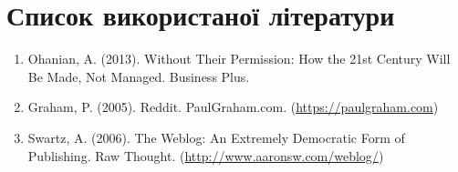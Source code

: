 \documentclass[oneside,14pt]{extarticle}
\begin{document}
\newpage
\section*{Список використаної літератури}
\begin{enumerate}
	\item Ohanian, A. (2013). Without Their Permission: How the 21st Century Will Be Made, Not Managed. Business Plus.
\item Graham, P. (2005). Reddit. PaulGraham.com. (\href{https://PaulGraham.com}{https://paulgraham.com})
\item Swartz, A. (2006). The Weblog: An Extremely Democratic Form of Publishing. Raw Thought. (\href{http://www.aaronsw.com/weblog/}{http://www.aaronsw.com/weblog/})
\end{enumerate}
\end{document}
